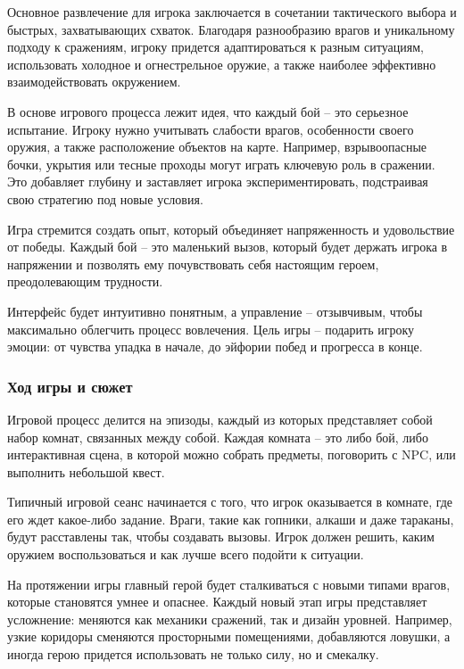 \documentclass[12pt]{article}
\begin{document}
        Основное развлечение для игрока заключается в сочетании тактического выбора и быстрых, захватывающих схваток. Благодаря разнообразию врагов и уникальному подходу к сражениям, игроку придется адаптироваться к разным ситуациям, использовать холодное и огнестрельное оружие, а также наиболее эффективно взаимодействовать окружением.  
    
        В основе игрового процесса лежит идея, что каждый бой – это серьезное испытание. Игроку нужно учитывать слабости врагов, особенности своего оружия, а также расположение объектов на карте. Например, взрывоопасные бочки, укрытия или тесные проходы могут играть ключевую роль в сражении. Это добавляет глубину и заставляет игрока экспериментировать, подстраивая свою стратегию под новые условия.  
    
        Игра стремится создать опыт, который объединяет напряженность и удовольствие от победы. Каждый бой – это маленький вызов, который будет держать игрока в напряжении и позволять ему почувствовать себя настоящим героем, преодолевающим трудности.  
    
        Интерфейс будет интуитивно понятным, а управление – отзывчивым, чтобы максимально облегчить процесс вовлечения. Цель игры – подарить игроку эмоции: от чувства упадка в начале, до эйфории побед и прогресса в конце.  
    
        \subsubsection{Ход игры и сюжет}
        Игровой процесс делится на эпизоды, каждый из которых представляет собой набор комнат, связанных между собой. Каждая комната – это либо бой, либо интерактивная сцена, в которой можно собрать предметы, поговорить с NPC, или выполнить небольшой квест.  
    
        Типичный игровой сеанс начинается с того, что игрок оказывается в комнате, где его ждет какое-либо задание. Враги, такие как гопники, алкаши и даже тараканы, будут расставлены так, чтобы создавать вызовы. Игрок должен решить, каким оружием воспользоваться и как лучше всего подойти к ситуации.  
    
        На протяжении игры главный герой будет сталкиваться с новыми типами врагов, которые становятся умнее и опаснее. Каждый новый этап игры представляет усложнение: меняются как механики сражений, так и дизайн уровней. Например, узкие коридоры сменяются просторными помещениями, добавляются ловушки, а иногда герою придется использовать не только силу, но и смекалку.  
    
\end{document}
